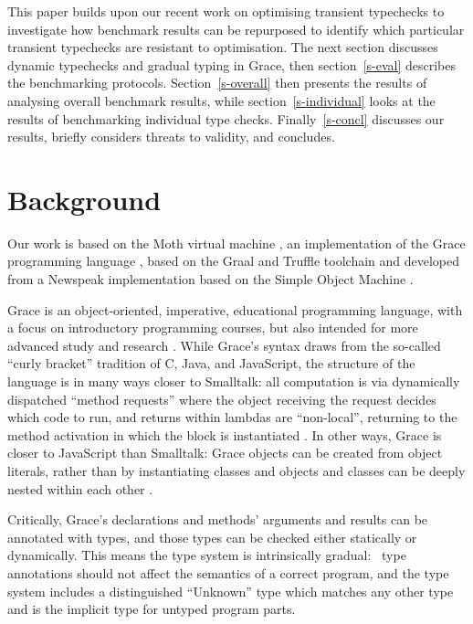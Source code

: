 \documentclass[sigplan,10pt,review,screen]{acmart}\settopmatter{printfolios=true}
\begin{document}
This paper builds upon our recent work on optimising transient
typechecks \cite{Roberts2017,roberts-and-co-ecoop-2019} to
investigate how benchmark results can be repurposed to identify which
particular transient typechecks are resistant to optimisation.
The next section discusses dynamic typechecks and gradual typing in
Grace, then section~\ref{s-eval} describes the benchmarking
protocols. Section~\ref{s-overall} then presents the results of
analysing overall benchmark results, while section~\ref{s-individual}
looks at the results of benchmarking individual type checks.
Finally~\ref{s-concl} discusses our results, briefly considers threats
to validity, and concludes.

\section{Background}
\label{s-bg}

Our work is based on the Moth virtual machine 
\cite{Roberts2017,roberts-and-co-ecoop-2019},
an implementation
of the Grace programming language 
\citep{graceOnward12,graceSigcse13},
based on the Graal and Truffle toolchain
\cite{Wurthinger:2017:PPE,Wurthinger2013}
and developed from a Newspeak implementation based on the  Simple
Object Machine \cite{Daloze2016,SOMns}.

Grace is an object-oriented, imperative, educational programming
language, with a focus on introductory programming
courses, but also intended for more advanced study and research \citep{graceOnward12,graceSigcse13}.
%
While Grace's syntax draws
from the so-called ``curly bracket'' tradition of C, Java, and
JavaScript, the structure of the language
is in many ways closer to Smalltalk:
all computation is via dynamically dispatched  ``method requests''
where the object receiving the request decides which code to run,
and
%
returns within lambdas are ``non-local'', returning to the method
activation in which the block is instantiated \citep{bluebook}.  In
other ways, Grace is closer to JavaScript than Smalltalk: Grace
objects can be created from object literals, rather than by
instantiating classes \citep{Black2007-emeraldHOPL,JonesECOOP2016} and
objects and classes can be deeply nested within each 
other \citep{betabook}.

Critically, Grace's declarations and methods' arguments
and results can be annotated with types, and those types can be  checked
either statically or dynamically. This means the type system is
intrinsically gradual:%
%
~type annotations should not affect the semantics of a correct
program\citep{XXXSiek2015}, and the type system
includes a distinguished ``{Unknown}'' type which matches any other type
and is the implicit type for untyped program parts.
\end{document}
